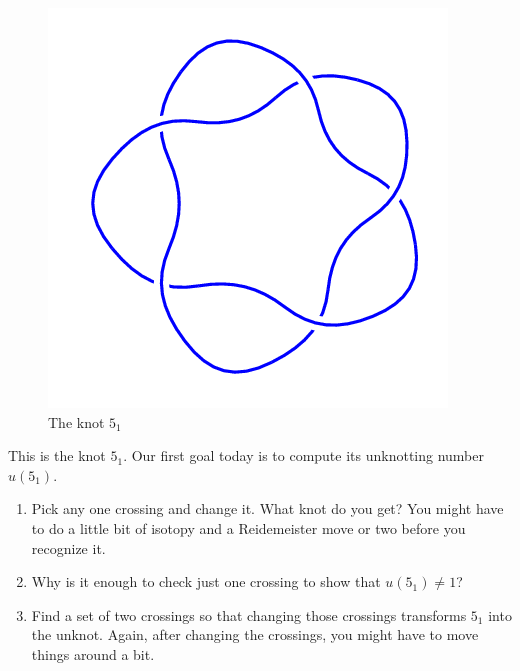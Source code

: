 \documentclass[12pt,letterpaper]{article}
\theoremstyle{definition}
\begin{document}
\setlength{\parskip}{1ex plus 0.5ex minus 0.2ex}
\setlength{\parindent}{0pt}

\pagestyle{fancy}
\cfoot{}


\begin{figure}
    \centering
    \includegraphics[width=.3\textwidth]{knotpics/5_1.png}
    \caption{The knot $5_1$}
\end{figure}
This is the knot $5_1$. Our first goal today is to compute its unknotting number $u(5_1)$.
\begin{enumerate}
\item Pick any one crossing and change it.
What knot do you get?
You might have to do a little bit of isotopy and a Reidemeister move or two before you recognize it.

\item Why is it enough to check just one crossing to show that $u(5_1) \neq 1$?

\item Find a set of two crossings so that changing those crossings transforms $5_1$ into the unknot. 
Again, after changing the crossings, you might have to move things around a bit.
\end{enumerate}



\clearpage
\end{document}
